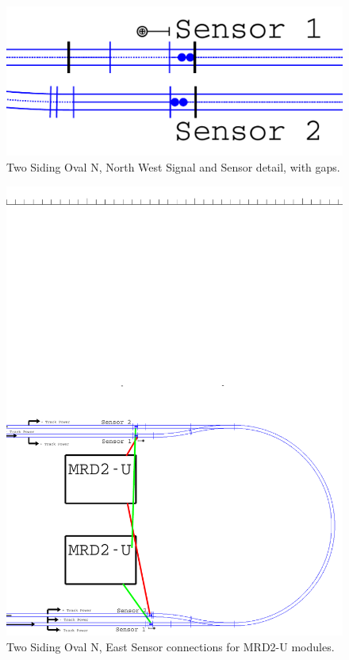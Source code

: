 \begin{figure}[hbpt]
\begin{centering}
\includegraphics[width=5in]{TwoSidingOval-N-NW-sig-sensor-detail.pdf}
\caption{Two Siding Oval N, North West Signal and Sensor detail, with gaps.}
\label{fig:TheLayout:TwoSidingOval-N-NW-sig-sensor-detail}
\end{centering}
\end{figure}
\begin{figure}[hbpt]
\begin{centering}
\includegraphics[width=5in]{TwoSidingOval-N-East-MRD2.pdf}
\caption{Two Siding Oval N, East Sensor connections for MRD2-U modules.}
\label{fig:TheLayout:TwoSidingOval-N-East-MRD2}
\end{centering}
\end{figure}
